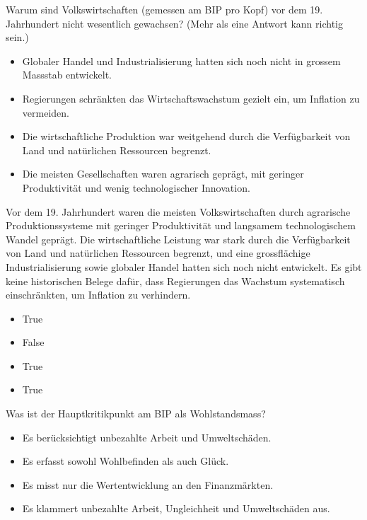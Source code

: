 \documentclass[
  nswissgerman,
  a4paper,
  openany]{book}
\providecommand{\tightlist}{%
  \setlength{\itemsep}{0pt}\setlength{\parskip}{0pt}}
\begin{document}
Warum sind Volkswirtschaften (gemessen am BIP pro Kopf) vor dem 19.
Jahrhundert nicht wesentlich gewachsen? (Mehr als eine Antwort kann
richtig sein.)

\begin{itemize}
\tightlist
\item[$\square$]
  Globaler Handel und Industrialisierung hatten sich noch nicht in
  grossem Massstab entwickelt.
\item[$\square$]
  Regierungen schränkten das Wirtschaftswachstum gezielt ein, um
  Inflation zu vermeiden.
\item[$\square$]
  Die wirtschaftliche Produktion war weitgehend durch die Verfügbarkeit
  von Land und natürlichen Ressourcen begrenzt.
\item[$\square$]
  Die meisten Gesellschaften waren agrarisch geprägt, mit geringer
  Produktivität und wenig technologischer Innovation.
\end{itemize}

Vor dem 19. Jahrhundert waren die meisten Volkswirtschaften durch
agrarische Produktionssysteme mit geringer Produktivität und langsamem
technologischem Wandel geprägt. Die wirtschaftliche Leistung war stark
durch die Verfügbarkeit von Land und natürlichen Ressourcen begrenzt,
und eine grossflächige Industrialisierung sowie globaler Handel hatten
sich noch nicht entwickelt. Es gibt keine historischen Belege dafür,
dass Regierungen das Wachstum systematisch einschränkten, um Inflation
zu verhindern.

\begin{itemize}
\tightlist
\item
  True
\item
  False
\item
  True
\item
  True
\end{itemize}

Was ist der Hauptkritikpunkt am BIP als Wohlstandsmass?

\begin{itemize}
\tightlist
\item[$\square$]
  Es berücksichtigt unbezahlte Arbeit und Umweltschäden.
\item[$\square$]
  Es erfasst sowohl Wohlbefinden als auch Glück.
\item[$\square$]
  Es misst nur die Wertentwicklung an den Finanzmärkten.
\item[$\square$]
  Es klammert unbezahlte Arbeit, Ungleichheit und Umweltschäden aus.
\end{itemize}
\end{document}
